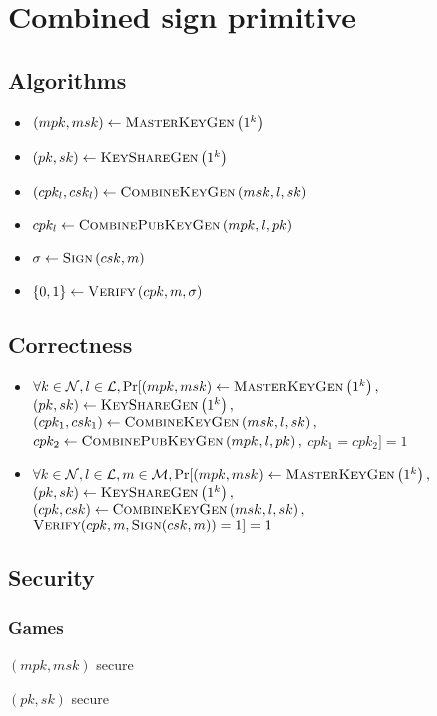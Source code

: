 \section{Combined sign primitive}
  \subsection{Algorithms}
    \begin{itemize}
      \item $\left(mpk, msk\right) \gets \textsc{MasterKeyGen}\left(1^k\right)$
      \item $\left(pk, sk\right) \gets \textsc{KeyShareGen}\left(1^k\right)$
      \item $\left(cpk_l, csk_l\right) \gets \textsc{CombineKeyGen}\left(msk, l,
      sk\right)$
      \item $cpk_l \gets \textsc{CombinePubKeyGen}\left(mpk, l, pk\right)$
      \item $\sigma \gets \textsc{Sign}\left(csk, m\right)$
      \item $\left\{0, 1\right\} \gets \textsc{Verify}\left(cpk, m,
      \sigma\right)$
    \end{itemize}

  \subsection{Correctness}
    \begin{itemize}
      \item $\forall k \in \mathcal{N}, l \in \mathcal{L},
      \Pr[(mpk, msk) \gets \textsc{MasterKeyGen}\left(1^k\right),$
      $\left(pk, sk\right) \gets \textsc{KeyShareGen}\left(1^k\right),$
      $\left(cpk_1, csk_1\right) \gets \textsc{CombineKeyGen}\left(msk, l,
      sk\right),$ \\
      $cpk_2 \gets \textsc{CombinePubKeyGen}\left(mpk, l, pk\right),$
      $cpk_1 = cpk_2] = 1$

      \item $\forall k \in \mathcal{N}, l \in \mathcal{L}, m \in \mathcal{M},
      \Pr[(mpk, msk) \gets \textsc{MasterKeyGen}\left(1^k\right),$
      $\left(pk, sk\right) \gets \textsc{KeyShareGen}\left(1^k\right),$
      $\left(cpk, csk\right) \gets \textsc{CombineKeyGen}\left(msk, l,
      sk\right),$
      $\textsc{Verify}(cpk, m, \textsc{Sign}(csk, m)) = 1] = 1$
    \end{itemize}

  \subsection{Security}
  \subsubsection{Games}
    \begin{gamebox}{$(mpk, msk)$ secure}
    \end{gamebox}

    \begin{gamebox}{$(pk, sk)$ secure}
    \end{gamebox}
